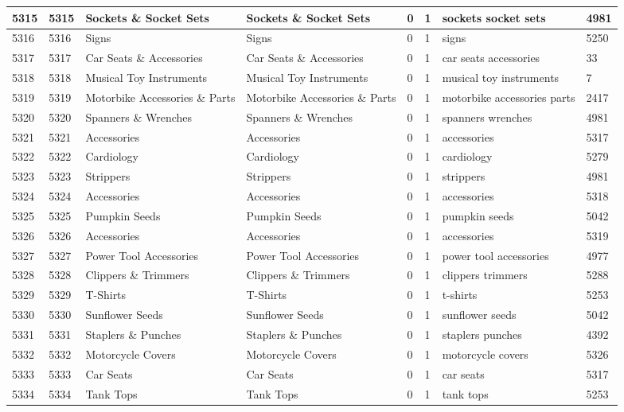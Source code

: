 \begin{longtable}{|l|l|l|l|l|l|l|l|}
5315 & 5315 & Sockets \& Socket Sets & Sockets \& Socket Sets & 0 & 1 & sockets socket sets & 4981 \\ \hline 
5316 & 5316 & Signs & Signs & 0 & 1 & signs & 5250 \\ \hline 
5317 & 5317 & Car Seats \& Accessories & Car Seats \& Accessories & 0 & 1 & car seats accessories & 33 \\ \hline 
5318 & 5318 & Musical Toy Instruments & Musical Toy Instruments & 0 & 1 & musical toy instruments & 7 \\ \hline 
5319 & 5319 & Motorbike Accessories \& Parts & Motorbike Accessories \& Parts & 0 & 1 & motorbike accessories parts & 2417 \\ \hline 
5320 & 5320 & Spanners \& Wrenches & Spanners \& Wrenches & 0 & 1 & spanners wrenches & 4981 \\ \hline 
5321 & 5321 & Accessories & Accessories & 0 & 1 & accessories & 5317 \\ \hline 
5322 & 5322 & Cardiology & Cardiology & 0 & 1 & cardiology & 5279 \\ \hline 
5323 & 5323 & Strippers & Strippers & 0 & 1 & strippers & 4981 \\ \hline 
5324 & 5324 & Accessories & Accessories & 0 & 1 & accessories & 5318 \\ \hline 
5325 & 5325 & Pumpkin Seeds & Pumpkin Seeds & 0 & 1 & pumpkin seeds & 5042 \\ \hline 
5326 & 5326 & Accessories & Accessories & 0 & 1 & accessories & 5319 \\ \hline 
5327 & 5327 & Power Tool Accessories & Power Tool Accessories & 0 & 1 & power tool accessories & 4977 \\ \hline 
5328 & 5328 & Clippers \& Trimmers & Clippers \& Trimmers & 0 & 1 & clippers trimmers & 5288 \\ \hline 
5329 & 5329 & T-Shirts & T-Shirts & 0 & 1 & t-shirts & 5253 \\ \hline 
5330 & 5330 & Sunflower Seeds & Sunflower Seeds & 0 & 1 & sunflower seeds & 5042 \\ \hline 
5331 & 5331 & Staplers \& Punches & Staplers \& Punches & 0 & 1 & staplers punches & 4392 \\ \hline 
5332 & 5332 & Motorcycle Covers & Motorcycle Covers & 0 & 1 & motorcycle covers & 5326 \\ \hline 
5333 & 5333 & Car Seats & Car Seats & 0 & 1 & car seats & 5317 \\ \hline 
5334 & 5334 & Tank Tops & Tank Tops & 0 & 1 & tank tops & 5253 \\ \hline 

\end{longtable}
